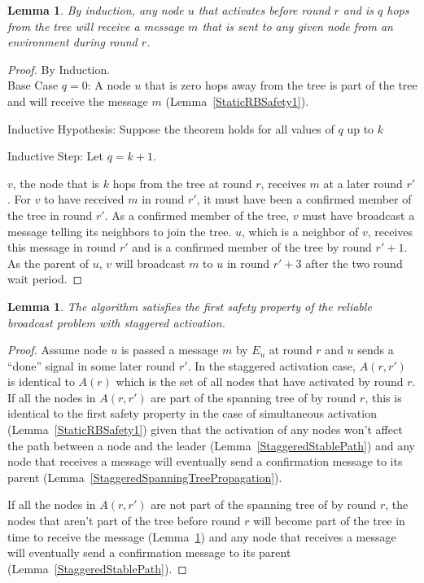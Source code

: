\documentclass[english]{article}
\newtheorem{lemma}[theorem]{Lemma}
\begin{document}
\begin{lemma}
\label{RBSafety1ByInduction}
  By induction, any node $u$ that activates before round $r$ and is $q$ hops from the tree will receive a message $m$ that is sent to any given node from an environment during round $r$.
\end{lemma}
\begin{proof} By Induction. \\

\noindent Base Case $q=0$: A node $u$ that is zero hops away from the tree is part of the tree and will receive the message $m$ (Lemma~\ref{StaticRBSafety1}).

\noindent Inductive Hypothesis: Suppose the theorem holds for all values of $q$ up to $k$

\noindent Inductive Step: Let $q=k+1$.

$v$, the node that is $k$ hops from the tree at round $r$, receives $m$ at a later round $r'$. For $v$ to have received $m$ in round $r'$, it must have been a confirmed member of the tree in round $r'$. As a confirmed member of the tree, $v$ must have broadcast a message telling its neighbors to join the tree. $u$, which is a neighbor of $v$, receives this message in round $r'$ and is a confirmed member of the tree by round $r'+1$. As the parent of $u$, $v$ will broadcast $m$ to $u$ in round $r'+3$ after the two round wait period.

\end{proof}

\begin{lemma}
\label{StaggeredRBSafety1}
  The algorithm satisfies the first safety property of the reliable broadcast problem with staggered activation.
\end{lemma}
\begin{proof}

Assume node $u$ is passed a message $m$ by $E_u$ at round $r$ and $u$ sends  a ``done'' signal in some later round $r'$.
In the staggered activation case, $A(r,r')$ is identical to $A(r)$ which is the set of all nodes that have activated by round $r$. If all the nodes in $A(r,r')$ are part of the spanning tree of by round $r$, this is identical to the first safety property in the case of simultaneous activation (Lemma~\ref{StaticRBSafety1}) given that the activation of any nodes won't affect the path between a node and the leader (Lemma~\ref{StaggeredStablePath}) and any node that receives a message will eventually send a confirmation message to its parent (Lemma~\ref{StaggeredSpanningTreePropagation}). 

If all the nodes in $A(r,r')$ are not part of the spanning tree of by round $r$, the nodes that aren't part of the tree before round $r$ will become part of the tree in time to receive the message (Lemma~\ref{RBSafety1ByInduction}) and any node that receives a message will eventually send a confirmation message to its parent (Lemma~\ref{StaggeredStablePath}).

\end{proof}
\end{document}
